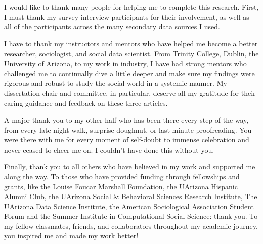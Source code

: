 
I would like to thank many people for helping me to complete this research. First, I must
thank my survey interview participants for their involvement, as well as all of the participants
across the many secondary data sources I used. 

I have to thank my instructors and mentors who have helped me become a better researcher, 
sociologist, and social data scientist. From Trinity College, Dublin, the University of Arizona, 
to my work in industry, I have had strong mentors who challenged me to continually
dive a little deeper and make sure my findings were rigorous and robust 
to study the social world in a systemic manner. 
My dissertation chair and committee, in particular, deserve all my gratitude for their caring guidance and feedback on these three articles. 

A major thank you to my other half who has been there every step of the way, from every late-night walk, 
surprise doughnut, or last minute proofreading. You were there with me for every moment of
self-doubt to immense celebration and never ceased to cheer me on. 
I couldn't have done this without you.

Finally, thank you to all others who have believed in my work and supported me along the way. 
To those who have provided funding through fellowships and grants, 
like the Louise Foucar Marshall Foundation,
the UArizona Hispanic Alumni Club, 
the UArizona Social \& Behavioral Sciences Research Institute,
The UArizona Data Science Institute, 
the American Sociological Association Student Forum and
the Summer Institute in Computational Social Science: thank you.
To my fellow classmates, friends, and 
collaborators throughout my academic journey, you inspired me and made my work better! 





